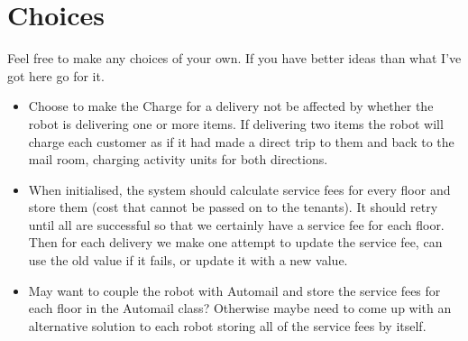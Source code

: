 \documentclass{article}
\begin{document}
\section{Choices}
Feel free to make any choices of your own. If you have better ideas than what I've got here go for it.
\begin{itemize}
    \item Choose to make the Charge for a delivery not be affected by whether the robot is delivering one or more items. If delivering two items the robot will charge each customer as if it had made a direct trip to them and back to the mail room, charging activity units for both directions.
    \item When initialised, the system should calculate service fees for every floor and store them (cost that cannot be passed on to the tenants). It should retry until all are successful so that we certainly have a service fee for each floor. Then for each delivery we make one attempt to update the service fee, can use the old value if it fails, or update it with a new value.
    \item May want to couple the robot with Automail and store the service fees for each floor in the Automail class? Otherwise maybe need to come up with an alternative solution to each robot storing all of the service fees by itself.
\end{itemize}
\end{document}
